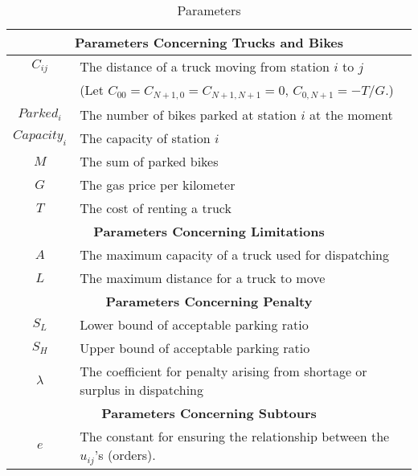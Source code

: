 \documentclass[a4paper, 12pt]{article}%
\theoremstyle{definition}
\begin{document}
\begin{table}[h!]
    \centering
    \begin{tabular}{cl}
	\toprule
        \multicolumn{2}{c}{{\textbf{Parameters Concerning Trucks and Bikes}}}  \\ \hline
        $C_{ij}$ & The distance of a truck moving from station $i$ to $j$\\
        & (Let $C_{00}  = C_{N+1,0} = C_{N+1,N+1} = 0$,   $C_{0,N+1} = - T/G $.) \\
        $Parked_i$ & The number of bikes parked at station $i$ at the moment \\
        $Capacity_i$ & The capacity of station $i$ \\
        $M$ & The sum of parked bikes \\
        $G$ & The gas price per kilometer \\
        $T$ & The cost of renting a truck \\ \hline
        \multicolumn{2}{c}{{\textbf{Parameters Concerning Limitations}}} \\ \hline
        $A$& The maximum capacity of a truck used for dispatching \\
        $L$& The maximum distance for a truck to move \\ \hline
        \multicolumn{2}{c}{{\textbf{Parameters Concerning Penalty}}} \\ \hline
        $S_L$ &  Lower bound of acceptable parking ratio\\
        $S_H$ &  Upper bound of acceptable parking ratio\\
        $\lambda$& The coefficient for penalty arising from shortage or surplus in dispatching\\ \hline
        \multicolumn{2}{c}{{\textbf{Parameters Concerning Subtours}}} \\ \hline
        $e$ &  The constant for ensuring the relationship between the $u_{ij}$'s (orders).\\
	\bottomrule
    \end{tabular}
    \caption{Parameters}
    \label{tab:Parameters}
\end{table}


\end{document}
